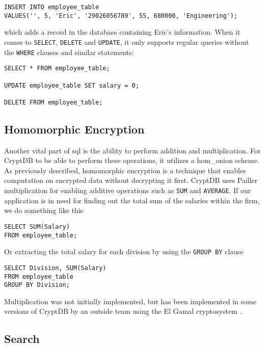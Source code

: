 \begin{verbatim}
INSERT INTO employee_table
VALUES('', 5, 'Eric', '29026056789', 55, 680000, 'Engineering');
\end{verbatim}

\noindent
which adds a record in the database containing Eric's information. When it comes to \verb!SELECT!, \verb!DELETE! and \verb!UPDATE!, it only supports regular queries without the \verb!WHERE! clauses and similar statements:

\begin{verbatim}
SELECT * FROM employee_table;

UPDATE employee_table SET salary = 0;

DELETE FROM employee_table;
\end{verbatim}



\subsection{Homomorphic Encryption}

Another vital part of \Gls{sql} is the ability to perform addition and multiplication. For CryptDB to be able to perform these operations, it utilizes a \Gls{hom_onion} scheme. As previously described, homomorphic encryption is a technique that enables computation on encrypted data without decrypting it first. CryptDB uses Pailler multiplication \cite{Paillier} for enabling additive operations such as \verb!SUM! and \verb!AVERAGE!. If our application is in need for finding out the total sum of the salaries within the firm, we do something like this

\begin{verbatim}
SELECT SUM(Salary)
FROM employee_table;
\end{verbatim}

\noindent
Or extracting the total salary for each division by using the \verb!GROUP BY! clause

\begin{verbatim}
SELECT Division, SUM(Salary)
FROM employee_table
GROUP BY Division;
\end{verbatim}

\noindent
Multiplication was not initially implemented, but has been implemented in some versions of CryptDB by an outside team using the El Gamal cryptosystem \cite{cryptdb_guidelines}. 



\subsection{Search}

